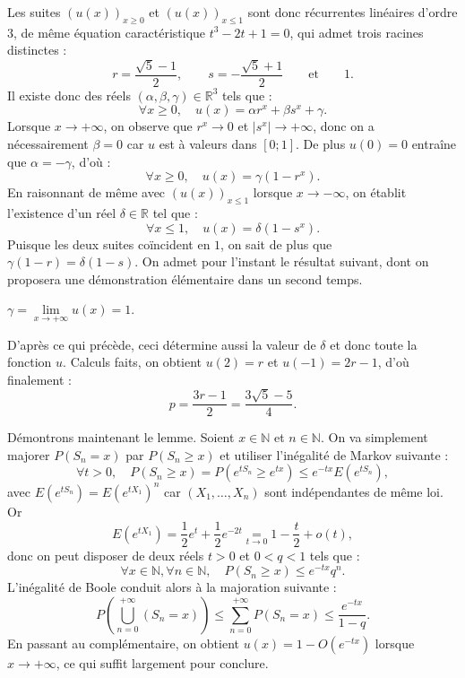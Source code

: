 Les suites $(u(x))_{x \geqslant 0}$ et $(u(x))_{x \leqslant 1}$ sont donc récurrentes linéaires d'ordre $3$, de même équation caractéristique
$t^3 - 2t + 1 = 0$, qui admet trois racines distinctes :
\[
r = \frac{\sqrt 5 - 1}{2},
\qquad
s = - \frac{\sqrt 5 + 1}{2}
\qquad\text{et}\qquad
1.
\]
Il existe donc des réels $(\alpha,\beta,\gamma) \in \mathbb R^3$ tels que :
$$
\forall x\geqslant 0,\quad
u(x) = \alpha r^x + \beta s^x + \gamma.
$$
Lorsque $x \to +\infty$, on observe que $r^x \to 0$ et $|s^x| \to +\infty$, donc on a nécessairement $\beta= 0$ car $u$ est à valeurs dans $[0;1]$. De plus $u(0) = 0$ entraîne que $\alpha = -\gamma$, d'où :
$$
\forall x\geqslant 0,\quad
u(x) = \gamma(1 - r^x).
$$
En raisonnant de même avec $(u(x))_{x \leqslant 1}$ lorsque $x \to -\infty$, on établit l'existence d'un réel $\delta \in \mathbb R$ tel que :
$$
\forall x \leqslant 1,\quad
u(x) = \delta(1-s^x).
$$
Puisque les deux suites coïncident en $1$, on sait de plus que $\gamma(1-r) = \delta (1-s).$
On admet pour l'instant le résultat suivant, dont on proposera une démonstration élémentaire dans un second temps.

\begin{lemme}
$\gamma = \lim\limits_{x\to +\infty} u(x) = 1$.
\end{lemme}

D'après ce qui précède, ceci détermine aussi la valeur de $\delta$ et donc toute la fonction $u$. Calculs faits, on obtient $u(2) = r$ et $u(-1) = 2r-1$, d'où finalement :
\[
{p = \dfrac{3r-1}{2} = \dfrac{3\sqrt 5 - 5}{4}}.
\]


Démontrons maintenant le lemme. Soient $x \in \mathbb N$ et $n \in \mathbb N$. On va simplement majorer $P(S_n = x)$ par $P(S_n \geqslant x)$ et utiliser l'inégalité de Markov suivante :
$$
\forall t > 0,\quad P(S_n \geqslant x) = P(e^{t S_n} \geqslant e^{tx}) \leqslant e^{-tx} E(e^{t S_n}),
$$
avec $E(e^{tS_n}) = E(e^{tX_1})^n$ car $(X_1,\dots,X_n)$ sont indépendantes de même loi. Or
$$
E(e^{tX_1}) = \frac12 e^t + \frac12 e^{-2t} \underset{t\to 0}{=} 1 - \frac t2 + o(t),
$$
donc on peut disposer de deux réels $t > 0$ et $0 < q < 1$ tels que :
$$
\forall x\in \mathbb N,\forall n \in \mathbb N,\quad P(S_n \geqslant x) \leqslant e^{-tx} q^n.
$$
L'inégalité de Boole conduit alors à la majoration suivante :
$$
P\left(\bigcup_{n=0}^{+\infty} (S_n = x)\right) \leqslant \sum_{n=0}^{+\infty} P(S_n = x) \leqslant \frac{e^{-tx}}{1-q}.
$$
En passant au complémentaire, on obtient $u(x) = 1 -O(e^{-tx})$ lorsque $x \to +\infty$, ce qui suffit largement pour conclure.


